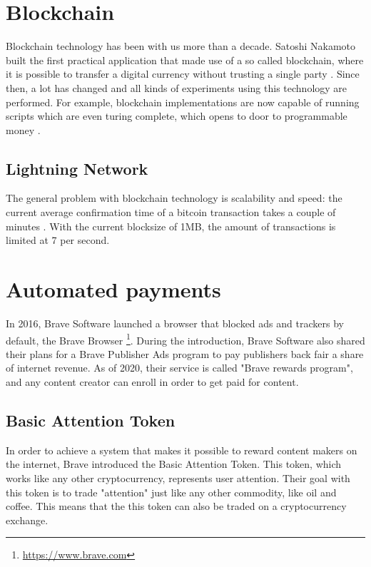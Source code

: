 \section{Blockchain}

Blockchain technology has been with us more than a decade. Satoshi Nakamoto built the first practical application that made use of a so called blockchain, where it is possible to transfer a digital currency without trusting a single party \cite{nakamoto2019bitcoin}. Since then, a lot has changed and all kinds of experiments using this technology are performed. For example, blockchain implementations are now capable of running scripts which are even turing complete, which opens to door to programmable money \cite{wood2014ethereum}.


\subsection{Lightning Network}
The general problem with blockchain technology is scalability and speed: the current average confirmation time of a bitcoin transaction takes a couple of minutes \cite{bamert2013have}. With the current blocksize of 1MB, the amount of transactions is limited at 7 per second.


\section{Automated payments}
In 2016, Brave Software launched a browser that blocked ads and trackers by default, the Brave Browser \footnote{\url{https://www.brave.com}}. During the introduction, Brave Software also shared their plans for a Brave Publisher Ads program to pay publishers back fair a share of internet revenue. As of 2020, their service is called "Brave rewards program", and any content creator can enroll in order to get paid for content. 

\subsection{Basic Attention Token} 
In order to achieve a system that makes it possible to reward content makers on the internet, Brave introduced the Basic Attention Token. This token, which works like any other cryptocurrency, represents user attention. Their goal with this token is to trade "attention" just like any other commodity, like oil and coffee. This means that the this token can also be traded on a cryptocurrency exchange. 

